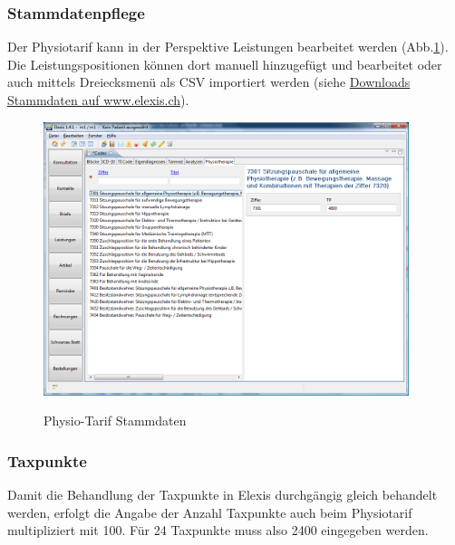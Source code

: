 \documentclass[a4paper]{scrartcl}
\begin{document}
\subsubsection{Stammdatenpflege}
Der Physiotarif kann in der Perspektive Leistungen bearbeitet werden (Abb.\ref{fig:abr26}). Die Leistungspositionen können dort manuell hinzugefügt und bearbeitet oder auch mittels Dreiecksmenü als CSV importiert werden (siehe \href{http://www.elexis.ch/jp/index.php?option=content&task=view&id=57}{Downloads Stammdaten auf www.elexis.ch}).
\begin{figure}
  \includegraphics[width=0.95\textwidth]{abr26}\\
  \caption{Physio-Tarif Stammdaten}\label{fig:abr26}
\end{figure}
\subsubsection{Taxpunkte}
Damit die Behandlung der Taxpunkte in Elexis durchgängig gleich behandelt werden, erfolgt die Angabe der Anzahl Taxpunkte auch beim Physiotarif multipliziert mit 100. Für 24 Taxpunkte muss also 2400 eingegeben werden.
\end{document}
